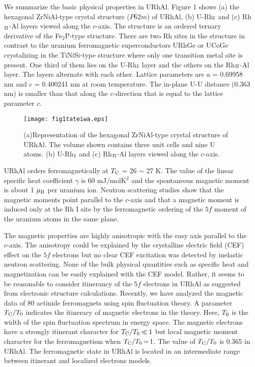 \documentclass[twocolumn,showpacs,preprintnumbers,amsmath,amssymb]{revtex4}
\begin{document}
 We summarize the basic physical properties in URhAl. Figure 1 shows (a) the hexagonal ZrNiAl-type crystal structure ($P{\bar 6}2m$) of URhAl, (b) U-Rh$_{\rm {I}}$ and (c) Rh$_{\rm {II}}$-Al layers viewed along the $c$-axis. The structure is an ordered ternary derivative of the Fe$_2$P-type structure. There are two Rh sites in the structure in contrast to the uranium ferromagnetic superconductors URhGe or UCoGe crystalizing in the TiNiSi-type structure where only one transition metal site is present. One third of them lies on the U-Rh$_{\rm I}$ layer and the others on the Rh$_{\rm {II}}$-Al layer. The layers alternate with each other. Lattice parameters are $a$ = 0.69958 nm and $c$ = 0.400241 nm at room temperature\cite{paixao1}. The in-plane U-U distance (0.363 nm) is smaller than that along the $c$-direction that is equal to the lattice parameter $c$.
       \begin{figure}[t]
\texttt{[image: fig1tateiwa.eps]}%
\caption{\label{fig:epsart}(a)Representation of the hexagonal ZrNiAl-type crystal structure of URhAl. The volume shown contains three unit cells and nine U atoms. (b) U-Rh$_{\rm {I}}$ and (c) Rh$_{\rm {II}}$-Al layers viewed along the $c$-axis.}
\end{figure} 

 URhAl orders ferromagnetically at $T_{\rm C}$ = 26 $\sim$ 27 K\cite{veenhuizen,javorsky2}. The value of the linear specific heat coefficient $\gamma$ is 60 mJ/molK$^2$ and the spontaneous magnetic moment is about 1 ${\mu}_{\rm B}$ per uranium ion. Neutron scattering studies show that the magnetic moments point parallel to the $c$-axis and that a magnetic moment is induced only at the Rh I site by the ferromagnetic ordering of the $5f$ moment of the uranium atoms in the same plane\cite{paixao1}. 
 
 The magnetic properties are highly anisotropic with the easy axis parallel to the $c$-axis. The anisotropy could be explained by the crystalline electric field (CEF) effect on the $5f$ electrons but no clear CEF excitation was detected by inelastic neutron scattering\cite{hiess}. None of the bulk physical quantities such as specific heat and magnetization can be easily explained with the CEF model. Rather, it seems to be reasonable to consider itinerancy of the $5f$ electrons in URhAl as suggested from electronic structure calculations\cite{kunes,antonov}. Recently, we have analyzed the magnetic data of 80 actinide ferromagnets using spin fluctuation theory\cite{tateiwa2}. A parameter ${T_{\rm C}}/{T_{\rm 0}}$ indicates the itineracy of magnetic electrons in the theory. Here, ${T_{\rm 0}}$ is the width of the spin fluctuation spectrum in energy space. The magnetic electrons have a strongly itinerant character for ${T_{\rm C}}/{T_{\rm 0}}{\,}{\ll}{\,}1$ but local magnetic moment character for the ferromagnetism when ${T_{\rm C}}/{T_{\rm 0}}{\,}{=}{\,}1$. The value of ${T_{\rm C}}/{T_{\rm 0}}$ is 0.365 in URhAl. The ferromagnetic state in URhAl is located in an intermediate range between itinerant and localized electrons models. 
 
\end{document}
